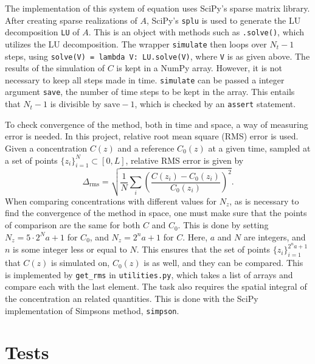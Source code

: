 \documentclass{article}
\begin{document}
    The implementation of this system of equation uses SciPy's sparse matrix library.
    After creating sparse realizations of $A$, SciPy's \verb|splu| is used to generate the LU decomposition \verb|LU| of $A$.
    This is an object with methods such as \verb|.solve()|, which utilizes the LU decomposition.
    The wrapper \verb|simulate| then loops over $N_t-1$ steps, using \verb|solve(V) = lambda V: LU.solve(V)|, where \verb|V| is as given above.
    The results of the simulation of $C$ is kept in a NumPy array.
    However, it is not necessary to keep all steps made in time.
    \verb|simulate| can be passed a integer argument \verb|save|, the number of time steps to be kept in the array.
    This entails that $N_t-1$ is divisible by $\mathrm{save}-1$, which is checked by an \verb|assert| statement.
    
    To check convergence of the method, both in time and space, a way of measuring error is needed.
    In this project, relative root mean square (RMS) error is used.
    Given a concentration $C(z)$ and a reference $C_0(z)$ at a given time, sampled at a set of points $\{z_i\}_{i=1}^N \subset [0, L]$, relative RMS error is given by
    \begin{equation*}
        \Delta_\mathrm{rms} = \sqrt{\frac{1}{N}\sum_i \left(\frac{C(z_i) - C_0(z_i)}{C_0(z_i)}\right)^2}.
    \end{equation*}
    When comparing concentrations with different values for $N_z$, as is necessary to find the convergence of the method in space, one must make sure that the points of comparison are the same for both $C$ and $C_0$.
    This is done by setting $N_z = 5\cdot 2^Na + 1$ for $C_0$, and $N_z = 2^n a + 1$ for $C$.
    Here, $a$ and $N$ are integers, and $n$ is some integer less or equal to $N$.
    This ensures that the set of points $\{z_i\}_{i=1}^{2^na+1}$ that $C(z)$ is simulated on, $C_0(z)$ is as well, and they can be compared.
    This is implemented by \verb|get_rms| in \verb|utilities.py|, which takes a list of arrays and compare each with the last element.
    The task also requires the spatial integral of the concentration an related quantities.
    This is done with the SciPy implementation of Simpsons method, \verb|simpson|.


    \section*{Tests}
\end{document}
